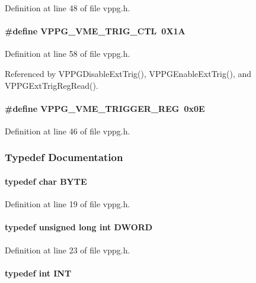 Definition at line 48 of file vppg.h.
\paragraph[{VPPG\_\-VME\_\-TRIG\_\-CTL}]{\setlength{\rightskip}{0pt plus 5cm}\#define VPPG\_\-VME\_\-TRIG\_\-CTL~0X1A}\hfill\label{vppg_8h_aa732cdc772c75f9ab0eccf3c9b7b2e96}


Definition at line 58 of file vppg.h.

Referenced by VPPGDisableExtTrig(), VPPGEnableExtTrig(), and VPPGExtTrigRegRead().
\paragraph[{VPPG\_\-VME\_\-TRIGGER\_\-REG}]{\setlength{\rightskip}{0pt plus 5cm}\#define VPPG\_\-VME\_\-TRIGGER\_\-REG~0x0E}\hfill\label{vppg_8h_a016718d338e001b7d9822cf3f71a0347}


Definition at line 46 of file vppg.h.

\subsubsection{Typedef Documentation}
\paragraph[{BYTE}]{\setlength{\rightskip}{0pt plus 5cm}typedef char {\bf BYTE}}\hfill\label{vppg_8h_ab6cc7b4aeb6ea31aba2b3fbfc83ff5e6}


Definition at line 19 of file vppg.h.
\paragraph[{DWORD}]{\setlength{\rightskip}{0pt plus 5cm}typedef unsigned long int {\bf DWORD}}\hfill\label{vppg_8h_a408a2366473807fbe658ba18e75dea66}


Definition at line 23 of file vppg.h.
\paragraph[{INT}]{\setlength{\rightskip}{0pt plus 5cm}typedef int {\bf INT}}\hfill\label{vppg_8h_a392e62da233ed3e2f7c3fd4f487a3896}


